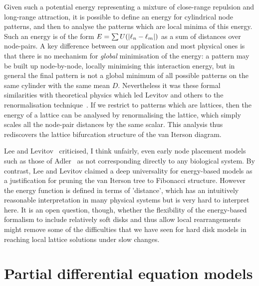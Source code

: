 Given such a potential energy representing a mixture of close-range repulsion and long-range attraction, it is possible to define an energy for cylindrical node patterns, and then to analyse the patterns which are local minima of this energy. Such an energy is of the form 
$E=\sum U(\left|\ell_{{n}}-\ell_{{m}}\right|)$ as a sum of distances over node-pairs.  {A key difference between our application and most physical ones is that there is no mechanism for \textit{global} minimisation of the energy: a pattern may be built up node-by-node, locally minimising this interaction energy, but in general the final pattern is not a global minimum of all possible patterns on the same cylinder with the same mean $D$.}
Nevertheless it was these formal similarities with theoretical physics which led Levitov and others to the renormalisation technique~\autocite{levitovFibonacciNumbersBotany1991}. If we restrict to patterns which are lattices, then the energy of a lattice can be analysed by renormalising the lattice, which simply scales all the node-pair distances by the same scalar. This analysis thus rediscovers the  lattice bifurcation structure of the van Iterson diagram.

 Lee and Levitov~\autocite{leeUniversalityPhyllotaxisMechanical1998} criticised, I think unfairly, even early node placement models such as those of Adler~\autocite{adlerConsequencesContactPressure1977} as not corresponding directly to any biological system. By contrast,
 Lee and Levitov claimed a deep universality for energy-based models as a justification for pruning the van Iterson tree to Fibonacci structure. However the energy function is defined in terms of 'distance', which has an intuitively reasonable interpretation in many physical systems but is very hard to interpret here. It is an open question, though, whether the flexibility of the energy-based formalism to include relatively soft disks and thus allow local rearrangements might remove some of the difficulties that we have seen for hard disk models in reaching local lattice solutions under slow changes. 
\newpage
\section{Partial differential equation models}
